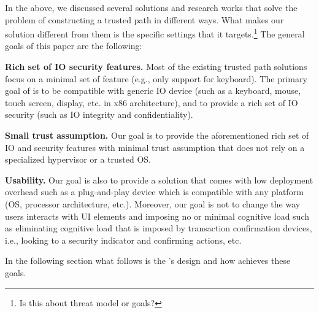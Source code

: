 In the above, we discussed several solutions and research works that solve the problem of constructing a trusted path in different ways. What makes our solution different from them is the specific settings that it targets.\footnote{Is this about threat model or goals?}
The general goals of this paper are the following:

\begin{mylist}
  \item  \textbf{Rich set of IO security features.} Most of the existing trusted path solutions focus on a minimal set of feature (e.g., only support for keyboard). The primary goal of \name is to be compatible with generic IO device (such as a keyboard, mouse, touch screen, display, etc. in x86 architecture), and to provide a rich set of IO security (such as IO integrity and confidentiality). 
  
  \item  \textbf{Small trust assumption.} Our goal is to provide the aforementioned rich set of IO and security features with minimal trust assumption that does not rely on a specialized hypervisor or a trusted OS. %
  
  \item \textbf{Usability.} Our goal is also to provide a solution that comes with low deployment overhead such as a plug-and-play device which is compatible with any platform (OS, processor architecture, etc.). Moreover, our goal is not to change the way users interacts with UI elements and imposing no or minimal cognitive load such as eliminating cognitive load that is imposed by transaction confirmation devices, i.e., looking to a security indicator and confirming actions, etc. 

\end{mylist}

In the following section what follows is the \name's design and how \name achieves these goals.
